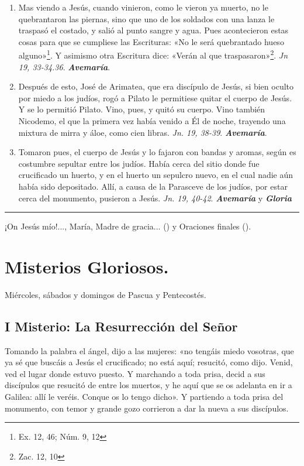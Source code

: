 \documentclass[11pt,a4paper]{book}
\begin{document}
\begin{enumerate}
        \item Mas viendo a Jesús, cuando vinieron, como le vieron ya muerto, no le quebrantaron las piernas, sino que uno de los soldados 
            con una lanza le traspasó el costado, y salió al punto sangre y agua. Pues acontecieron estas cosas para que se cumpliese las
            Escrituras: «No le será quebrantado hueso alguno»\footnote{Ex. 12, 46; Núm. 9, 12}. Y asimismo otra Escritura dice: «Verán al que
            traspasaron»\footnote{Zac. 12, 10}. \emph{Jn 19, 33-34.36}. \textbf{\emph{Avemaría}}.

        \item Después de esto, José de Arimatea, que era discípulo de Jesús, si bien oculto por miedo a los judíos, rogó a Pilato le permitiese
            quitar el cuerpo de Jesús. Y se lo permitió Pilato. Vino, pues, y quitó su cuerpo. Vino también Nicodemo, el que la primera vez había
            venido a Él de noche, trayendo una mixtura de mirra y áloe, como cien libras.
            \emph{Jn. 19, 38-39}. \textbf{\emph{Avemaría}}.            

        \item Tomaron pues, el cuerpo de Jesús y lo fajaron con bandas y aromas, según es costumbre sepultar entre los judíos. Había cerca
            del sitio donde fue crucificado un huerto, y en el huerto un sepulcro nuevo, en el cual nadie aún había sido depositado.
            Allí, a causa de la Parasceve de los judíos, por estar cerca del monumento, pusieron a Jesús. 
            \emph{Jn. 19, 40-42}. \textbf{\emph{Avemaría}} y \textbf{\emph{Gloria}}
    \end{enumerate}    

    \rule{\textwidth}{0.5pt}
    ¡On Jesús mío!..., María, Madre de gracia... () y Oraciones finales ().

    \newpage

    \section*{Misterios Gloriosos.}
    Miércoles, sábados y domingos de Pascua y Pentecostés.

    \subsection*{I Misterio: La Resurrección del Señor}

    Tomando la palabra el ángel, dijo a las mujeres: «no tengáis miedo vosotras, que ya sé que buscáis a Jesús el crucificado; 
    no está aquí; resucitó, como dijo. Venid, ved el lugar donde estuvo puesto. Y marchando a toda prisa, 
    decid a sus discípulos que resucitó de entre los muertos, y he aquí que se os adelanta en ir a Galilea: allí le veréis. 
    Conque os lo tengo dicho». Y partiendo a toda prisa del monumento, con temor y grande gozo corrieron a dar la nueva a sus discípulos. 
\end{document}
